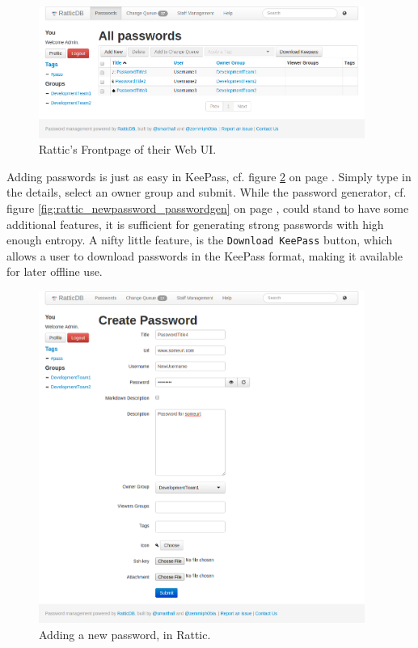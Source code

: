 			\begin{figure}[h!]
				\centering
				\includegraphics[width=0.95\textwidth]{figures/analysis/rattic_main.png}
				\caption{Rattic's Frontpage of their Web UI.}
				\label{fig:rattic_main}
			\end{figure}

			Adding passwords is just as easy in KeePass, cf. figure \ref{fig:rattic_newpassword_main} on page \pageref{fig:rattic_newpassword_main}. Simply type in the details, select an owner group and submit. While the password generator, cf. figure \ref{fig:rattic_newpassword_passwordgen} on page \pageref{fig:rattic_newpassword_passwordgen}, could stand to have some additional features, it is sufficient for generating strong passwords with high enough entropy. A nifty little feature, is the \verb=Download KeePass= button, which allows a user to download passwords in the KeePass format, making it available for later offline use.

			\begin{figure}[h!]
				\centering
				\includegraphics[width=0.95\textwidth]{figures/analysis/rattic_newpassword_main.png}
				\caption{Adding a new password, in Rattic.}
				\label{fig:rattic_newpassword_main}
			\end{figure}

